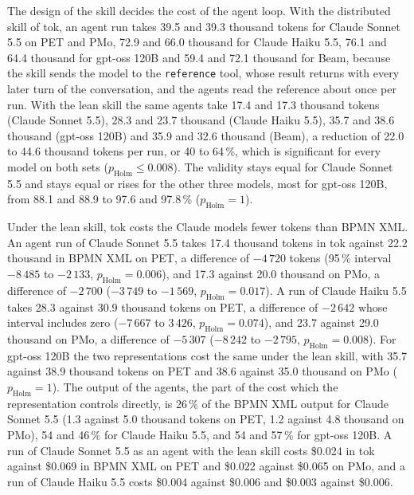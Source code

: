 \documentclass[11pt,a4paper]{article}
\begin{document}
The design of the skill decides the cost of the agent loop. With the distributed skill of tok, an agent run takes 39.5 and 39.3 thousand tokens for Claude Sonnet 5.5 on PET and PMo, 72.9 and 66.0 thousand for Claude Haiku 5.5, 76.1 and 64.4 thousand for gpt-oss 120B and 59.4 and 72.1 thousand for Beam, because the skill sends the model to the \texttt{reference} tool, whose result returns with every later turn of the conversation, and the agents read the reference about once per run. With the lean skill the same agents take 17.4 and 17.3 thousand tokens (Claude Sonnet 5.5), 28.3 and 23.7 thousand (Claude Haiku 5.5), 35.7 and 38.6 thousand (gpt-oss 120B) and 35.9 and 32.6 thousand (Beam), a reduction of 22.0 to 44.6 thousand tokens per run, or 40 to 64\,\%, which is significant for every model on both sets ($p_\text{Holm}\le0.008$). The validity stays equal for Claude Sonnet 5.5 and stays equal or rises for the other three models, most for gpt-oss 120B, from 88.1 and 88.9 to 97.6 and 97.8\,\% ($p_\text{Holm}=1$).

Under the lean skill, tok costs the Claude models fewer tokens than BPMN XML. An agent run of Claude Sonnet 5.5 takes 17.4 thousand tokens in tok against 22.2 thousand in BPMN XML on PET, a difference of $-4\,720$ tokens (95\,\% interval $-8\,485$ to $-2\,133$, $p_\text{Holm}=0.006$), and 17.3 against 20.0 thousand on PMo, a difference of $-2\,700$ ($-3\,749$ to $-1\,569$, $p_\text{Holm}=0.017$). A run of Claude Haiku 5.5 takes 28.3 against 30.9 thousand tokens on PET, a difference of $-2\,642$ whose interval includes zero ($-7\,667$ to $3\,426$, $p_\text{Holm}=0.074$), and 23.7 against 29.0 thousand on PMo, a difference of $-5\,307$ ($-8\,242$ to $-2\,795$, $p_\text{Holm}=0.008$). For gpt-oss 120B the two representations cost the same under the lean skill, with 35.7 against 38.9 thousand tokens on PET and 38.6 against 35.0 thousand on PMo ($p_\text{Holm}=1$). The output of the agents, the part of the cost which the representation controls directly, is 26\,\% of the BPMN XML output for Claude Sonnet 5.5 (1.3 against 5.0 thousand tokens on PET, 1.2 against 4.8 thousand on PMo), 54 and 46\,\% for Claude Haiku 5.5, and 54 and 57\,\% for gpt-oss 120B. A run of Claude Sonnet 5.5 as an agent with the lean skill costs \$0.024 in tok against \$0.069 in BPMN XML on PET and \$0.022 against \$0.065 on PMo, and a run of Claude Haiku 5.5 costs \$0.004 against \$0.006 and \$0.003 against \$0.006.
\end{document}

